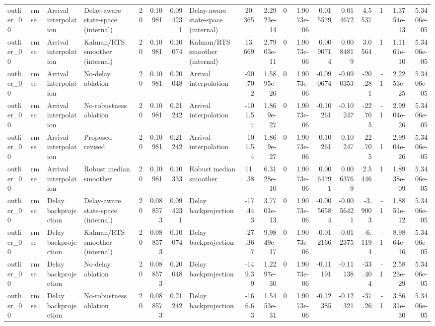 \begin{table}[!htbp]
{\begin{tabular}{llllrrrlrrrrrrrrrr}
outlier_00 & rmse & Arrival interpolation & Delay-aware state-space (internal) & 20 & 0.10981 & 0.094231 & Delay-aware state-space (internal) & 20.365 & 2.2923e-14 & 0 & 1.9073e-06 & 0.015579 & 0.014672 & 4.5537 & 1 & 1.3754e-13 & 5.3406e-05 \\
outlier_00 & rmse & Arrival interpolation & Kalman/RTS smoother (internal) & 20 & 0.10981 & 0.10074 & Kalman/RTS smoother (internal) & 13.669 & 2.7903e-11 & 0 & 1.9073e-06 & 0.0090714 & 0.0084819 & 3.0564 & 1 & 1.1161e-10 & 5.3406e-05 \\
outlier_00 & rmse & Arrival interpolation & No-delay ablation & 20 & 0.10981 & 0.20048 & Arrival interpolation & -90.702 & 1.5895e-26 & 0 & 1.9073e-06 & -0.090674 & -0.090353 & -20.281 & -1 & 2.2253e-25 & 5.3406e-05 \\
outlier_00 & rmse & Arrival interpolation & No-robustness ablation & 20 & 0.10981 & 0.21242 & Arrival interpolation & -101.54 & 1.869e-27 & 0 & 1.9073e-06 & -0.10261 & -0.10247 & -22.705 & -1 & 2.9904e-26 & 5.3406e-05 \\
outlier_00 & rmse & Arrival interpolation & Proposed revised & 20 & 0.10981 & 0.21242 & Arrival interpolation & -101.54 & 1.869e-27 & 0 & 1.9073e-06 & -0.10261 & -0.10247 & -22.705 & -1 & 2.9904e-26 & 5.3406e-05 \\
outlier_00 & rmse & Arrival interpolation & Robust median smoother & 20 & 0.10981 & 0.10333 & Robust median smoother & 11.38 & 6.3128e-10 & 0 & 1.9073e-06 & 0.0064791 & 0.0063769 & 2.5446 & 1 & 1.8938e-09 & 5.3406e-05 \\
outlier_00 & rmse & Delay backprojection & Delay-aware state-space (internal) & 20 & 0.088573 & 0.094231 & Delay backprojection & -17.443 & 3.7701e-13 & 0 & 1.9073e-06 & -0.0056584 & -0.0056421 & -3.9003 & -1 & 1.8851e-12 & 5.3406e-05 \\
outlier_00 & rmse & Delay backprojection & Kalman/RTS smoother (internal) & 20 & 0.088573 & 0.10074 & Delay backprojection & -27.367 & 9.9849e-17 & 0 & 1.9073e-06 & -0.012166 & -0.012375 & -6.1194 & -1 & 8.9864e-16 & 5.3406e-05 \\
outlier_00 & rmse & Delay backprojection & No-delay ablation & 20 & 0.088573 & 0.20048 & Delay backprojection & -149.39 & 1.2297e-30 & 0 & 1.9073e-06 & -0.11191 & -0.11138 & -33.404 & -1 & 2.5823e-29 & 5.3406e-05 \\
outlier_00 & rmse & Delay backprojection & No-robustness ablation & 20 & 0.088573 & 0.21242 & Delay backprojection & -166.63 & 1.5453e-31 & 0 & 1.9073e-06 & -0.12385 & -0.12321 & -37.26 & -1 & 3.8631e-30 & 5.3406e-05 \\

\end{tabular}}
\end{table}
